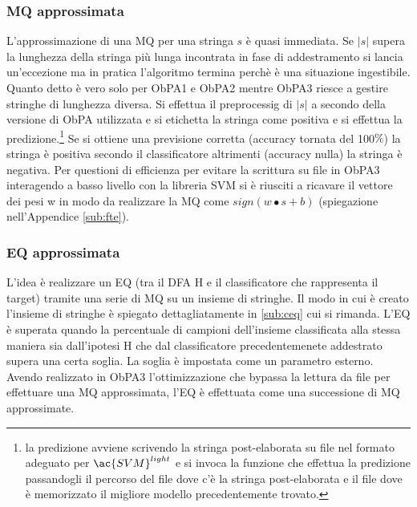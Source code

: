\subsubsection{MQ approssimata}
L'approssimazione di una \ac{MQ} per una stringa $s$ è quasi immediata. Se $|s|$ supera la lunghezza della stringa più lunga incontrata in fase di addestramento si lancia un'eccezione ma in pratica l'algoritmo termina perchè è una situazione ingestibile. Quanto detto è vero solo per \ac{ObPA}1 e \ac{ObPA}2 mentre \ac{ObPA}3 riesce a gestire stringhe di lunghezza diversa. Si effettua il preprocessig di $|s|$ a secondo della versione di \ac{ObPA} utilizzata e si etichetta la stringa come positiva e si effettua la predizione.\footnote{la predizione avviene scrivendo la stringa post-elaborata su file nel formato adeguato per $\ac{SVM}^{light}$ e si invoca la funzione che effettua la predizione passandogli il percorso del file dove c'è la stringa post-elaborata e il file dove è memorizzato il migliore modello precedentemente trovato.} Se si ottiene una previsione corretta (accuracy tornata del 100$\%$) la stringa è positiva secondo il classificatore altrimenti (accuracy nulla) la stringa è negativa. Per questioni di efficienza per evitare la scrittura su file in \ac{ObPA}3 interagendo a basso livello con la libreria \ac{SVM} si è riusciti a ricavare il vettore dei pesi w in modo da realizzare la \ac{MQ} come $sign(w \bullet s + b)$ (spiegazione nell'Appendice  \ref{sub:fte}).
 
 \subsubsection{EQ approssimata}
L'idea è realizzare un \ac{EQ} (tra il \ac{DFA} \ac{H} e il classificatore che rappresenta il target) tramite una serie di \ac{MQ} su un insieme di stringhe. Il modo in cui è creato l'insieme di stringhe è spiegato dettagliatamente in \ref{sub:ceq} cui si rimanda. L'\ac{EQ} è superata quando la percentuale di campioni dell'insieme  classificata alla stessa maniera sia dall'ipotesi \ac{H} che dal classificatore precedentemenete addestrato supera una certa soglia. La soglia è impostata come un parametro esterno. 
Avendo realizzato in \ac{ObPA}3 l'ottimizzazione che bypassa la lettura da file per effettuare una \ac{MQ} approssimata, l'\ac{EQ} è effettuata come una successione di \ac{MQ} approssimate.



 


